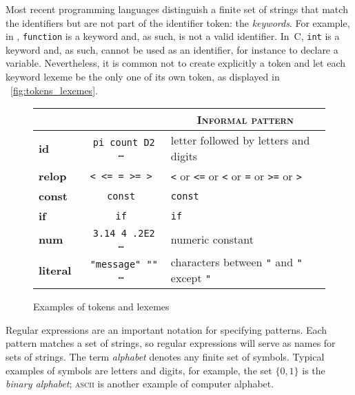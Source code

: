 Most recent programming languages distinguish a finite set of strings
that match the identifiers but are not part of the identifier token:
the \emph{keywords}. For example, in \Ada, \texttt{function} is a
keyword and, as such, is not a valid identifier. In~C, \texttt{int} is
a keyword and, as such, cannot be used as an identifier, for instance
to declare a variable. Nevertheless, it is common not to create
explicitly a  token and let each keyword lexeme be
the only one of its own token, as displayed in
\fig~\vref{fig:tokens_lexemes}.
\begin{figure}
\centering
\begin{tabular}{@{}>{\bfseries\sffamily}l|>{\tt}c|l@{}}
\toprule
  \multicolumn{1}{c}{\textsc{Token}}
& \multicolumn{1}{c}{\textsc{Sample lexemes}}
& \multicolumn{1}{c}{\textsc{Informal pattern}}\\
\midrule
id       & pi count D2 \dots & letter followed by letters and digits\\
relop    & < <= = >= >   & \texttt{<} or \texttt{<=} or \texttt{<} or \texttt{=} or \texttt{>=} or \texttt{>}\\
const    & const         & \texttt{const}\\
if       & if            & \texttt{if}\\
num      & 3.14 4 .2E2 \ldots  & numeric constant\\
literal  & "message" ""  \ldots & characters between \texttt{"} and \texttt{"} except \texttt{"}\\
\bottomrule
\end{tabular}
\caption{Examples of tokens and lexemes}
\label{fig:tokens_lexemes}
\end{figure}

Regular expressions are an important notation for specifying
patterns. Each pattern matches a set of strings, so regular
expressions will serve as names for sets of strings. The term
\emph{alphabet} denotes any finite set of symbols. Typical examples of
symbols are letters and digits, for example, the set \(\{0, 1\}\) is
the \emph{binary alphabet}; \textsc{ascii} is another example of
computer alphabet.

